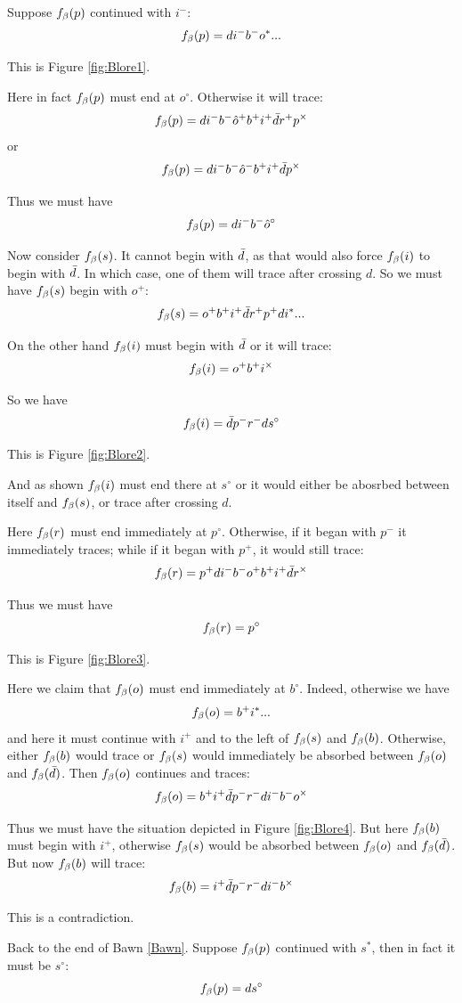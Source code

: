 \label{Blore}
Suppose $f_\beta(p)$ continued with $i^-$:
\[
f_\beta(p) = d i^- b^- o^*...
\]

This is Figure \ref{fig:Blore1}.

Here in fact $f_\beta(p)$ must end at $o^\circ$. Otherwise it will trace:
\[
f_\beta(p) = d i^- b^- \hat{o}^+ b^+ i^+ \bar{d} r^+ p^\times
\]
or
\[
f_\beta(p) = d i^- b^- \hat{o}^- b^+ i^+ \bar{d} p^\times
\]

Thus we must have
\[
f_\beta(p) = d i^- b^- \hat{o}^\circ
\]

Now consider $f_\beta(s)$. It cannot begin with $\bar{d}$, as that would also force $f_\beta(i)$ to begin with $\bar{d}$. In which case, one of them will trace after crossing $d$. So we must have $f_\beta(s)$ begin with $o^+$:
\[
f_\beta(s) = o^+ b^+ i^+ \bar{d} r^+ p^+ d i^*...
\]

On the other hand $f_\beta(i)$ must begin with $\bar{d}$ or it will trace:
\[
f_\beta(i) = o^+ b^+ i^\times
\]

So we have
\[
f_\beta(i) = \bar{d} p^- r^- d s^\circ
\]

This is Figure \ref{fig:Blore2}.

And as shown $f_\beta(i)$ must end there at $s^\circ$ or it would either be abosrbed between itself and $f_\beta(s)$, or trace after crossing $d$.

Here $f_\beta(r)$ must end immediately at $p^\circ$. Otherwise, if it began with $p^-$ it immediately traces; while if it began with $p^+$, it would still trace:
\[
f_\beta(r) = p^+ d i^- b^- o^+ b^+ i^+ \bar{d} r^\times
\]

Thus we must have
\[
f_\beta(r) = p^\circ
\]

This is Figure \ref{fig:Blore3}.

Here we claim that $f_\beta(o)$ must end immediately at $b^\circ$. Indeed, otherwise we have
\[
f_\beta(o) = b^+ i^*...
\]
and here it must continue with $i^+$ and to the left of $f_\beta(s)$ and $f_\beta(b)$. Otherwise, either $f_\beta(b)$ would trace or $f_\beta(s)$ would immediately be absorbed between $f_\beta(o)$ and $f_\beta(\bar{d})$. Then $f_\beta(o)$ continues and traces:
\[
f_\beta(o) = b^+ i^+ \bar{d} p^- r^- d i^- b^- o^\times
\]

Thus we must have the situation depicted in Figure \ref{fig:Blore4}. But here $f_\beta(b)$ must begin with $i^+$, otherwise $f_\beta(s)$ would be absorbed between $f_\beta(o)$ and $f_\beta(\bar{d})$. But now $f_\beta(b)$ will trace:
\[
f_\beta(b) = i^+ \bar{d} p^- r^- d i^- b^\times
\]

This is a contradiction.

\label{Chark}
Back to the end of Bawn \ref{Bawn}. Suppose $f_\beta(p)$ continued with $s^*$, then in fact it must be $s^\circ$:
\[
f_\beta(p) = d s^\circ
\]

